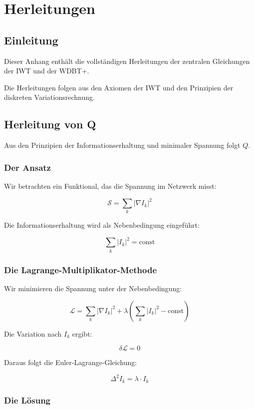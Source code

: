\chapter{Herleitungen}

\section{Einleitung}

Dieser Anhang enthält die vollständigen Herleitungen der zentralen Gleichungen der IWT und der WDBT+.

Die Herleitungen folgen aus den Axiomen der IWT und den Prinzipien der diskreten Variationsrechnung.

\section{Herleitung von Q}

Aus den Prinzipien der Informationserhaltung und minimaler Spannung folgt \( Q \).

\subsection{Der Ansatz}

Wir betrachten ein Funktional, das die Spannung im Netzwerk misst:

\[
\mathcal{S} = \sum_k |\nabla I_k|^2
\]

Die Informationserhaltung wird als Nebenbedingung eingeführt:

\[
\sum_k |I_k|^2 = \text{const}
\]

\subsection{Die Lagrange-Multiplikator-Methode}

Wir minimieren die Spannung unter der Nebenbedingung:

\[
\mathcal{L} = \sum_k |\nabla I_k|^2 + \lambda \left( \sum_k |I_k|^2 - \text{const} \right)
\]

Die Variation nach \( I_k \) ergibt:

\[
\delta \mathcal{L} = 0
\]

Daraus folgt die Euler-Lagrange-Gleichung:

\[
\Delta^2 I_k = \lambda \cdot I_k
\]

\subsection{Die Lösung}


